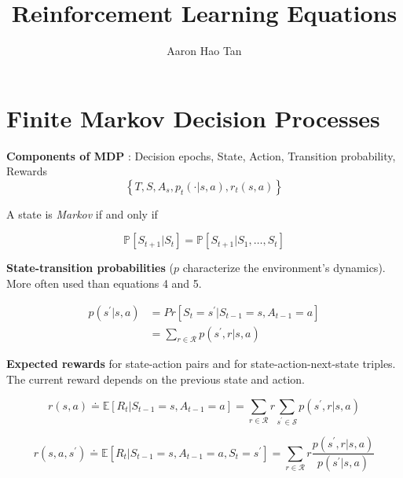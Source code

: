 \documentclass{article}
\author{Aaron Hao Tan}
\title{Reinforcement Learning Equations}
\date{\vspace{-5ex}}
\begin{document}
\maketitle

\noindent
\section{Finite Markov Decision Processes}

\noindent
\textbf{Components of MDP}
: {Decision epochs, State, Action, Transition probability,
Rewards}
\begin{equation}
\left\{T, S, A_{s}, p_{t}(\cdot | s, a), r_{t}(s, a)\right\}
\end{equation}

\noindent
A state is \textit{Markov} if and only if 

\begin{equation}
\mathbb{P}\left[S_{t+1} | S_{t}\right]=\mathbb{P}\left[S_{t+1} | S_{1}, \ldots, S_{t}\right]
\end{equation}

\noindent
\textbf{State-transition probabilities}
($p$ characterize the environment's dynamics).
More often used than equations 4 and 5.

\begin{equation}
\begin{aligned}
p(s^{\prime} | s, a) &= Pr [S_{t} = s^{\prime} | S_{t-1}=s, A_{t-1}=a] \\
&=\sum_{r \in \mathcal{R}} p(s^{\prime}, r | s, a)
\end{aligned}
\end{equation}

\noindent
\textbf{Expected rewards }
for state-action pairs and for state-action-next-state triples.
The current reward depends on the previous state and action.

\begin{equation}
r(s, a) \doteq \mathbb{E} \left[R_{t} | S_{t-1}=s, A_{t-1}=a\right]=\sum_{r \in \mathcal{R}} r \sum_{s^{\prime} \in \mathcal{S}} p\left(s^{\prime}, r | s, a\right)
\end{equation}

\begin{equation}
r\left(s, a, s^{\prime}\right) \doteq \mathbb{E}\left[R_{t} | S_{t-1}=s, A_{t-1}=a, S_{t}=s^{\prime}\right]=\sum_{r \in \mathcal{R}} r \frac{p\left(s^{\prime}, r | s, a\right)}{p\left(s^{\prime} | s, a\right)}
\end{equation}
\end{document}
